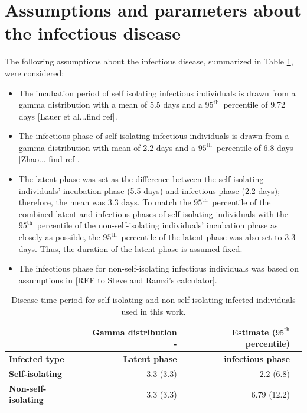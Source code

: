 \documentclass[sr]{drdc-report}
\def\nfpc{\ensuremath{95^\mathrm{th}}}
\begin{document}
\section{Assumptions and parameters about the infectious disease}\label{Assumptions_section_label}

The following assumptions about the infectious disease, summarized in Table \ref{table_diseasePhase}, were considered:

\begin{itemize}
\item The incubation period of self isolating infectious individuals is drawn from a gamma distribution with a mean of 5.5 days and a \nfpc\ percentile of 9.72 days [Lauer et al...find ref].  
\item The infectious phase of self-isolating infectious individuals is drawn from a gamma distribution with mean of 2.2 days and a \nfpc\ percentile of 6.8 days [Zhao... find ref].
\item The latent phase was set as the difference between the self isolating individuals' incubation phase (5.5 days) and infectious phase (2.2 days); therefore, the mean was 3.3 days. To match the \nfpc\ percentile of the combined latent and infectious phases of self-isolating individuals with the \nfpc\ percentile of the non-self-isolating individuals' incubation phase as closely as possible, the \nfpc\ percentile of the latent phase was also set to 3.3 days. Thus, the duration of the latent phase is assumed fixed.  
\item The infectious phase for non-self-isolating infectious individuals was based on assumptions in [REF to Steve and Ramzi’s calculator].
\end{itemize}

\begin{table}
\centering
\caption{Disease time period for self-isolating and non-self-isolating infected individuals used in this work.}\label{table_diseasePhase}
\begin{tabular}{lrrl}
& Gamma distribution {   } - &Estimate (\nfpc\ percentile)\\
\hline
\textbf{\underline{Infected type}} & \textbf{\underline{Latent phase}} & \textbf{\underline{infectious phase}}\\
\textbf{Self-isolating} & 3.3 (3.3) & 2.2 (6.8)\\
\textbf{Non-self-isolating} & 3.3 (3.3) & 6.79 (12.2)\\
\hline
\end{tabular}
\end{table}
\end{document}
